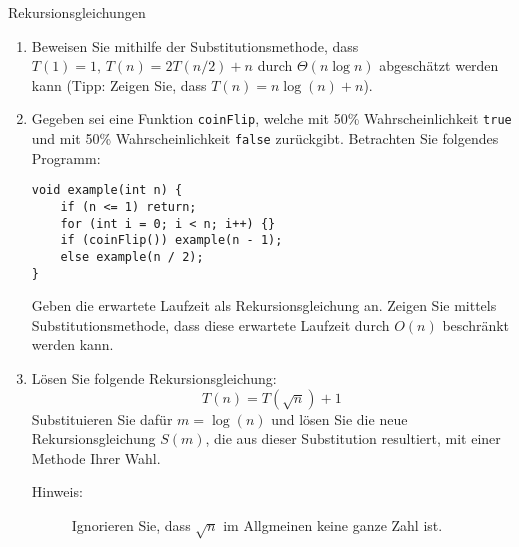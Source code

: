 \documentclass[11pt,a4paper]{article}
\begin{document}
\begin{aufgabe}{1}{Rekursionsgleichungen}
\begin{enumerate}
    \item Beweisen Sie mithilfe der Substitutionsmethode, dass $T(1) = 1, \, T(n) = 2T(n / 2) + n$ durch $\Theta(n \log n)$ abgeschätzt werden kann (Tipp: Zeigen Sie, dass $T(n) = n \log(n) + n$).

    \item Gegeben sei eine Funktion \texttt{coinFlip}, welche mit 50\% Wahrscheinlichkeit \texttt{true} und mit 50\% Wahrscheinlichkeit \texttt{false} zurückgibt. Betrachten Sie folgendes Programm:
    \begin{lstlisting}
void example(int n) {
    if (n <= 1) return;
    for (int i = 0; i < n; i++) {}
    if (coinFlip()) example(n - 1);
    else example(n / 2);
}
    \end{lstlisting}
    Geben die erwartete Laufzeit als Rekursionsgleichung an.
    Zeigen Sie mittels Substitutionsmethode, dass diese erwartete Laufzeit durch $O(n)$ beschränkt werden kann.

    \item
    Lösen Sie folgende Rekursionsgleichung:
    \begin{equation*}
        T(n) = T\left(\sqrt{n}\right) + 1
    \end{equation*}
    Substituieren Sie dafür $m = \log(n)$ und lösen Sie die neue Rekursionsgleichung $S(m)$, die aus dieser Substitution resultiert, mit einer Methode Ihrer Wahl.
    \begin{description}
        \item[Hinweis:] Ignorieren Sie, dass $\sqrt{n}$ im Allgmeinen keine ganze Zahl ist.
    \end{description}
\end{enumerate}
\end{aufgabe}
\end{document}
